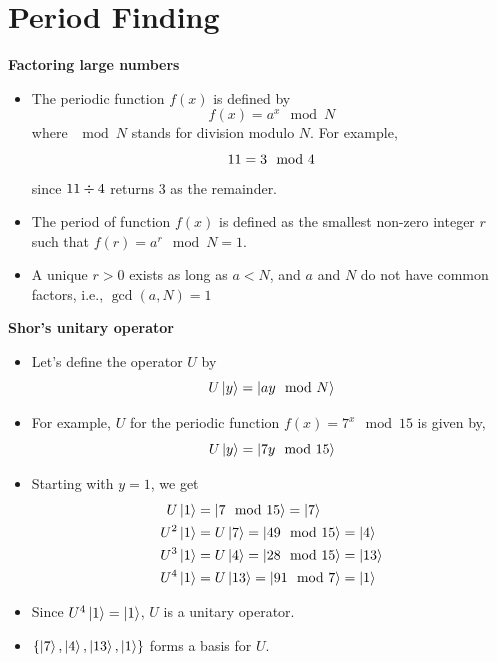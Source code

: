 \documentclass[english]{beamer}
\begin{document}
\section{Period Finding}

\begin{frame}{\textbf{Factoring large numbers}}

\begin{itemize}
\item The periodic function $f(x)$ is defined by
\begin{equation}
	f(x) = a^x \mod N
\end{equation}
where $\mod N$ stands for division modulo $N$. For example,
\begin{equation}
	11 = 3 \mod 4 \notag
\end{equation}
since $11 \divisionsymbol 4$ returns 3 as the remainder.
\item The period of function $f(x)$ is defined as the smallest non-zero integer $r$ such that $f(r) = a^r \mod N = 1$.
\item A unique $r>0$ exists as long as $a<N$, and $a$ and $N$ do not have common factors, i.e., $\gcd(a,N)=1$ 


\end{itemize}
\end{frame}



\begin{frame}{\textbf{Shor's unitary operator}}

\begin{itemize}
\item Let's define the operator $U$ by
\begin{equation}
	U \ket{y} = \ket{ay\mod N}
\end{equation}
\item For example, $U$ for the periodic function $f(x) = 7^x \mod 15$ is given by,
\begin{equation}
	U \ket{y} = \ket{7 y\mod 15} \notag 
\end{equation}


\item Starting with $y=1$, we get
	\begin{align}
		U \ket{1} &= \ket {7 \mod 15} = \ket{7} \notag \\
U^2 \ket{1} &= U \ket{7}= \ket {49 \mod 15} = \ket{4} \notag  \\
U^3 \ket{1} &= U \ket{4}= \ket {28 \mod 15} = \ket{13} \notag \\
U^4 \ket{1} &= U \ket{13}= \ket {91 \mod 7} = \ket{1} \notag 
	\end{align}
\item Since $U^4\ket{1}=\ket{1}$, $U$ is a unitary operator. 
\item $\{ \ket{7}, \ket{4}, \ket{13}, \ket{1} \}$ forms a basis for $U$.

\end{itemize}
\end{frame}
\end{document}
